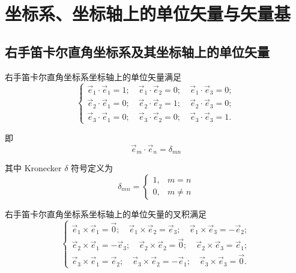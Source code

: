 \section{坐标系、坐标轴上的单位矢量与矢量基}

\subsection{右手笛卡尔直角坐标系及其坐标轴上的单位矢量}


右手笛卡尔直角坐标系坐标轴上的单位矢量满足
\begin{equation}
\begin{cases}
\vec{e}_1 \cdot \vec{e}_1 = 1; \quad \vec{e}_1 \cdot \vec{e}_2 = 0; \quad \vec{e}_1 \cdot \vec{e}_3 = 0; \\
\vec{e}_2 \cdot \vec{e}_1 = 0; \quad \vec{e}_2 \cdot \vec{e}_2 = 1; \quad \vec{e}_2 \cdot \vec{e}_3 = 0; \\
\vec{e}_3 \cdot \vec{e}_1 = 0; \quad \vec{e}_3 \cdot \vec{e}_2 = 0; \quad \vec{e}_3 \cdot \vec{e}_3 = 1.
\end{cases}
\end{equation}

即
\begin{equation}\label{eq:4.kronecker}
\vec{e}_m \cdot \vec{e}_n = \delta_{mn}
\end{equation}

其中 Kronecker $\delta$ 符号定义为
\begin{equation}\label{eq:4.delta_def}
\delta_{mn} = \begin{cases} 1, & m = n \\ 0, & m \neq n \end{cases}
\end{equation}

右手笛卡尔直角坐标系坐标轴上的单位矢量的叉积满足
\begin{equation}
\begin{cases}
\vec{e}_1 \times \vec{e}_1 = \vec{0}; \quad \vec{e}_1 \times \vec{e}_2 = \vec{e}_3; \quad \vec{e}_1 \times \vec{e}_3 = -\vec{e}_2; \\
\vec{e}_2 \times \vec{e}_1 = -\vec{e}_3; \quad \vec{e}_2 \times \vec{e}_2 = \vec{0}; \quad \vec{e}_2 \times \vec{e}_3 = \vec{e}_1; \\
\vec{e}_3 \times \vec{e}_1 = \vec{e}_2; \quad \vec{e}_3 \times \vec{e}_2 = -\vec{e}_1; \quad \vec{e}_3 \times \vec{e}_3 = \vec{0}.
\end{cases}
\end{equation}

